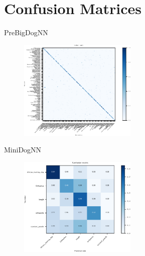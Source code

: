   \section{Confusion Matrices}

  \begin{frame}[noframenumbering]
    \tableofcontents[currentsection]
  \end{frame}

  \begin{frame}{PreBigDogNN}
    \begin{figure}
      \centering
      \includegraphics[width=0.5\textwidth]{logos/PreBigDogNN/confusion_matrix_bigpretrained.pdf}
      \label{fig:cm_prebig}
    \end{figure}
  \end{frame}

  \begin{frame}{MiniDogNN}
    \begin{figure}
      \centering
      \includegraphics[width=0.5\textwidth]{logos/MiniDogNN/confusion_matrix_mini.pdf}
      \label{fig:cm_mini}
    \end{figure}
  \end{frame}

